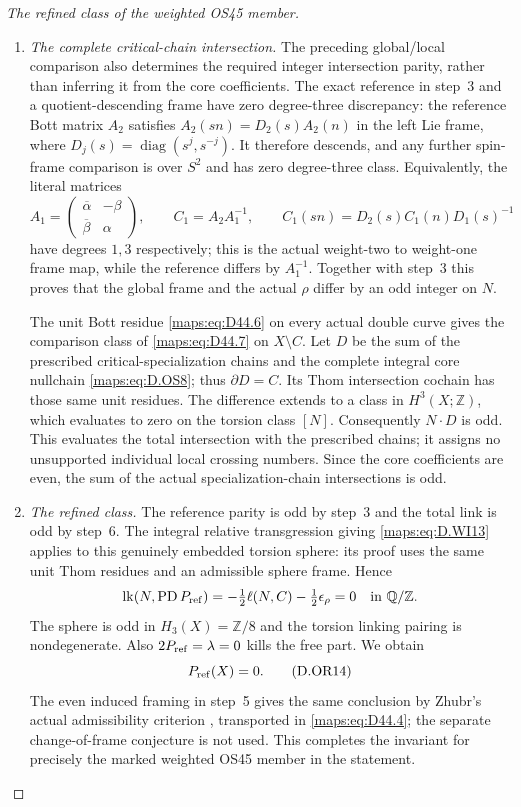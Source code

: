 \begin{proof}[The refined class of the weighted OS45 member]
\begin{enumerate}
\item \emph{The complete critical-chain intersection.}
The preceding global/local comparison also determines the required
integer intersection parity, rather than inferring it from the core
coefficients.  The exact reference in step~3 and a quotient-descending
frame have zero degree-three discrepancy: the reference Bott matrix
$A_2$ satisfies $A_2(sn)=D_2(s)A_2(n)$ in the left Lie frame, where
$D_j(s)=\operatorname{diag}(s^j,s^{-j})$.
It therefore descends, and any further spin-frame comparison is over
$S^2$ and has zero degree-three class.  Equivalently, the literal matrices
\[
 A_1=\begin{pmatrix}\overline\alpha&-\beta\\
                     \overline\beta&\alpha\end{pmatrix},\qquad
 C_1=A_2A_1^{-1},\qquad
 C_1(sn)=D_2(s)C_1(n)D_1(s)^{-1}
\]
have degrees $1,3$ respectively; this is the actual weight-two to
weight-one frame map, while the reference differs by $A_1^{-1}$.
Together with step~3 this proves that the global frame and the actual
$\rho$ differ by an odd integer on $N$.

The unit Bott residue \eqref{maps:eq:D44.6} on every actual double curve
gives the comparison class of \eqref{maps:eq:D44.7} on $X\setminus C$.
Let $D$ be the sum of the prescribed critical-specialization chains
and the complete integral core nullchain \eqref{maps:eq:D.OS8}; thus
$\partial D=C$.  Its Thom intersection cochain has those same unit
residues.  The difference extends to a class in $H^3(X;\mathbb Z)$,
which evaluates to zero on the torsion class $[N]$.
Consequently $N\cdot D$ is odd.  This evaluates the total intersection
with the prescribed chains; it assigns no unsupported individual
local crossing numbers.  Since the core coefficients are even,
the sum of the actual specialization-chain intersections is odd.

\item \emph{The refined class.}
The reference parity is odd by step~3 and the total link is odd by
step~6.  The integral relative transgression giving
\eqref{maps:eq:D.WI13} applies to this genuinely embedded torsion sphere:
its proof uses the same unit Thom residues and an admissible sphere
frame.  Hence
\[
 \operatorname{lk}(N,\operatorname{PD}P_{\rm ref})
 =-\tfrac12\ell(N,C)-\tfrac12\epsilon_\rho=0
                  \quad\hbox{in }\mathbb Q/\mathbb Z.
\]
The sphere is odd in $H_3(X)=\mathbb Z/8$ and the torsion linking
pairing is nondegenerate.  Also $2P_{\rm ref}=\lambda=0$ kills the
free part.  We obtain
\[
                              P_{\rm ref}(X)=0.
 \tag{D.OR14}\label{maps:eq:D.OR14}
\]
The even induced framing in step~5 gives the same conclusion by
Zhubr's actual admissibility criterion
\cite[Theorem~1, p.~6; \S5, pp.~8--9]{ffZhubr13}, transported in
\eqref{maps:eq:D44.4}; the separate change-of-frame conjecture is not
used.  This completes the invariant for precisely the marked weighted
OS45 member in the statement.
\end{enumerate}
\end{proof}
